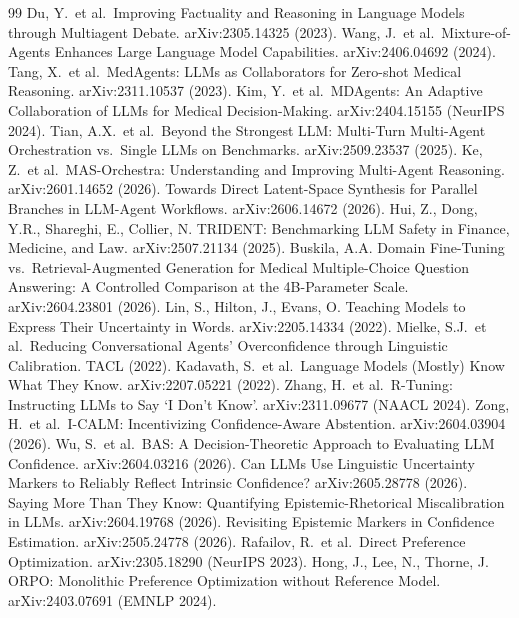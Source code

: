 \documentclass[11pt]{article}
\begin{document}
\begin{thebibliography}{99}
\small
{} Du, Y.\ et al.\ Improving Factuality and Reasoning in Language Models through Multiagent Debate. arXiv:2305.14325 (2023).
 Wang, J.\ et al.\ Mixture-of-Agents Enhances Large Language Model Capabilities. arXiv:2406.04692 (2024).
 Tang, X.\ et al.\ MedAgents: LLMs as Collaborators for Zero-shot Medical Reasoning. arXiv:2311.10537 (2023).
 Kim, Y.\ et al.\ MDAgents: An Adaptive Collaboration of LLMs for Medical Decision-Making. arXiv:2404.15155 (NeurIPS 2024).
 Tian, A.X.\ et al.\ Beyond the Strongest LLM: Multi-Turn Multi-Agent Orchestration vs.\ Single LLMs on Benchmarks. arXiv:2509.23537 (2025).
 Ke, Z.\ et al.\ MAS-Orchestra: Understanding and Improving Multi-Agent Reasoning. arXiv:2601.14652 (2026).
 Towards Direct Latent-Space Synthesis for Parallel Branches in LLM-Agent Workflows. arXiv:2606.14672 (2026).
 Hui, Z., Dong, Y.R., Shareghi, E., Collier, N. TRIDENT: Benchmarking LLM Safety in Finance, Medicine, and Law. arXiv:2507.21134 (2025).
 Buskila, A.A. Domain Fine-Tuning vs.\ Retrieval-Augmented Generation for Medical Multiple-Choice Question Answering: A Controlled Comparison at the 4B-Parameter Scale. arXiv:2604.23801 (2026).
 Lin, S., Hilton, J., Evans, O. Teaching Models to Express Their Uncertainty in Words. arXiv:2205.14334 (2022).
 Mielke, S.J.\ et al.\ Reducing Conversational Agents' Overconfidence through Linguistic Calibration. TACL (2022).
 Kadavath, S.\ et al.\ Language Models (Mostly) Know What They Know. arXiv:2207.05221 (2022).
 Zhang, H.\ et al.\ R-Tuning: Instructing LLMs to Say `I Don't Know'. arXiv:2311.09677 (NAACL 2024).
 Zong, H.\ et al.\ I-CALM: Incentivizing Confidence-Aware Abstention. arXiv:2604.03904 (2026).
 Wu, S.\ et al.\ BAS: A Decision-Theoretic Approach to Evaluating LLM Confidence. arXiv:2604.03216 (2026).
 Can LLMs Use Linguistic Uncertainty Markers to Reliably Reflect Intrinsic Confidence? arXiv:2605.28778 (2026).
 Saying More Than They Know: Quantifying Epistemic-Rhetorical Miscalibration in LLMs. arXiv:2604.19768 (2026).
 Revisiting Epistemic Markers in Confidence Estimation. arXiv:2505.24778 (2026).
 Rafailov, R.\ et al.\ Direct Preference Optimization. arXiv:2305.18290 (NeurIPS 2023).
 Hong, J., Lee, N., Thorne, J. ORPO: Monolithic Preference Optimization without Reference Model. arXiv:2403.07691 (EMNLP 2024).

\end{thebibliography}
\end{document}
